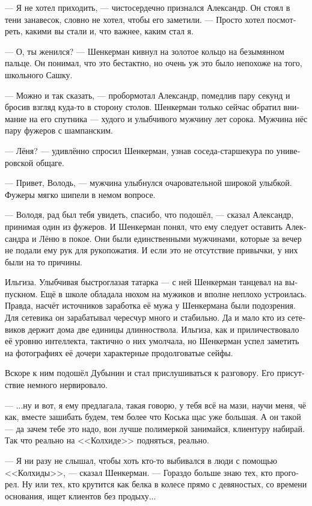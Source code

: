 \documentclass[a5paper,12pt,fleqn]{extbook}\usepackage{cooltooltips}\usepackage{polyglossia}\setdefaultlanguage[babelshorthands=true]{russian}\setotherlanguage{english}\defaultfontfeatures{Ligatures=TeX,Mapping=tex-text} \usepackage{xcolor}\definecolor{lightgray}{HTML}{bbbbbb}\color{lightgray}\newcommand{\ml}[3]{\textenglish{\textcolor{black}{#3}}}
\begin{document}
--- Я не хотел приходить, --- чистосердечно признался Александр.
Он стоял в тени занавесок, словно не хотел, чтобы его заметили.
--- Просто хотел посмотреть, какими вы стали и, что важнее, каким стал я.

--- О, ты женился? --- Шенкерман кивнул на золотое кольцо на безымянном пальце.
Он понимал, что это бестактно, но очень уж это было непохоже на того, школьного Сашку.

--- Можно и так сказать, --- пробормотал Александр, помедлив пару секунд и бросив взгляд куда-то в сторону столов.
Шенкерман только сейчас обратил внимание на его спутника --- худого и улыбчивого мужчину лет сорока.
Мужчина нёс пару фужеров с шампанским.

--- Лёня? --- удивлённо спросил Шенкерман, узнав соседа-старшекура по универовской общаге.

--- Привет, Володь, --- мужчина улыбнулся очаровательной широкой улыбкой.
Фужеры мягко шипели в немом вопросе.

--- Володя, рад был тебя увидеть, спасибо, что подошёл, --- сказал Александр, принимая один из фужеров.
И Шенкерман понял, что ему следует оставить Александра и Лёню в покое.
Они были единственными мужчинами, которые за вечер не подали ему рук для рукопожатия.
И если это не отсутствие привычки, у них были на то причины.

Ильгиза.
Улыбчивая быстроглазая татарка --- с ней Шенкерман танцевал на выпускном.
Ещё в школе обладала нюхом на мужиков и вполне неплохо устроилась.
Правда, насчёт источников заработка её мужа у Шенкермана были подозрения.
Для сетевика он зарабатывал чересчур много и стабильно.
Да и мало кто из сетевиков держит дома две единицы длинноствола.
Ильгиза, как и приличествовало её уровню интеллекта, тактично о них умолчала, но Шенкерман успел заметить на фотографиях её дочери характерные продолговатые сейфы.

Вскоре к ним подошёл Дубынин и стал прислушиваться к разговору.
Его присутствие немного нервировало.

--- ...ну и вот, я ему предлагала, такая говорю, у тебя всё на мази, научи меня, чё как, вместе зашибать будем, тем более что Коська щас уже большая.
А он такой --- да зачем тебе это надо, вон лучше полимеркой занимайся, клиентуру набирай.
Так что реально на <<Колхиде>> подняться, реально.

--- Я ни разу не слышал, чтобы хоть кто-то выбивался в люди с помощью <<Колхиды>>, --- сказал Шенкерман.
--- Гораздо больше знаю тех, кто прогорел.
Ну или тех, кто крутится как белка в колесе прямо с девяностых, со времени основания, ищет клиентов без продыху...
\end{document}
